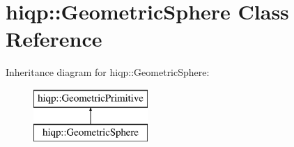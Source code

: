 \hypertarget{classhiqp_1_1GeometricSphere}{\section{hiqp\-:\-:Geometric\-Sphere Class Reference}
\label{classhiqp_1_1GeometricSphere}
}
Inheritance diagram for hiqp\-:\-:Geometric\-Sphere\-:\begin{figure}[H]
\begin{center}
\leavevmode
\includegraphics[height=2.000000cm]{classhiqp_1_1GeometricSphere}
\end{center}
\end{figure}
